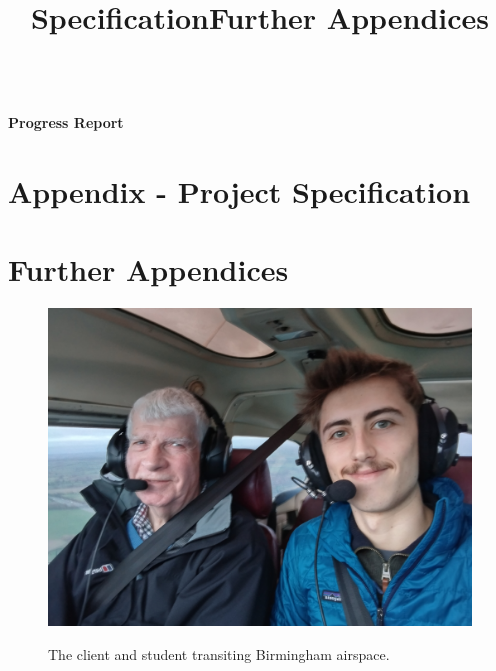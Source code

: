 \documentclass[a4paper,fleqn,12pt]{article}
\begin{document}
\pagestyle{plain}


\begin{center}
    \\
    \vspace{1.5em}
    \textbf{\Large{Progress Report}}\\
    \vspace{1em}
\end{center}







\newpage
\title{Specification}
\section{Appendix - Project Specification}





\newpage
\title{Further Appendices}
\section{Further Appendices}
\begin{figure}[H]
    \centering
	\includegraphics[scale = 0.08]{../document-resources/images/Aerial-selfie}
    \label{aerial-selfie}
    \caption{The client and student transiting Birmingham airspace.}
\end{figure}

\newpage
\printbibliography
\end{document}

